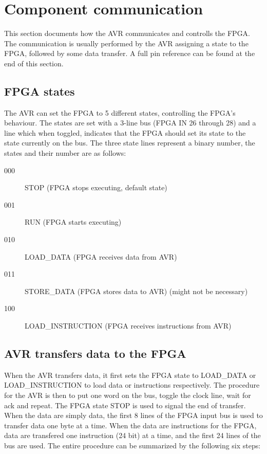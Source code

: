 \section{Component communication}

This section documents how the AVR communicates and controlls the FPGA. The communication is usually performed by the AVR assigning a state to the FPGA, followed by some data transfer. A full pin reference can be found at the end of this section.

\subsection{FPGA states}

The AVR can set the FPGA to 5 different states, controlling the FPGA's behaviour. The states are set with a 3-line bus (FPGA IN 26 through 28) and a line which when toggled, indicates that the FPGA should set its state to the state currently on the bus. The three state lines represent a binary number, the states and their number are as follows:

\begin{description}
\item[000] STOP (FPGA stops executing, default state) 
\item[001] RUN (FPGA starts executing) 
\item[010] LOAD\_DATA (FPGA receives data from AVR) 
\item[011] STORE\_DATA (FPGA stores data to AVR) (might not be necessary) 
\item[100] LOAD\_INSTRUCTION (FPGA receives instructions from AVR) 
\end{description}


\subsection{AVR transfers data to the FPGA}

When the AVR transfers data, it first sets the FPGA state to LOAD\_DATA or LOAD\_INSTRUCTION to load data or instructions respectively. The procedure for the AVR is then to put one word on the bus, toggle the clock line, wait for ack and repeat. The FPGA state STOP is used to signal the end of transfer. When the data are simply data, the first 8 lines of the FPGA input bus is used to transfer data one byte at a time. When the data are instructions for the FPGA, data are transfered one instruction (24 bit) at a time, and the first 24 lines of the bus are used. The entire procedure can be summarized by the following six steps:

